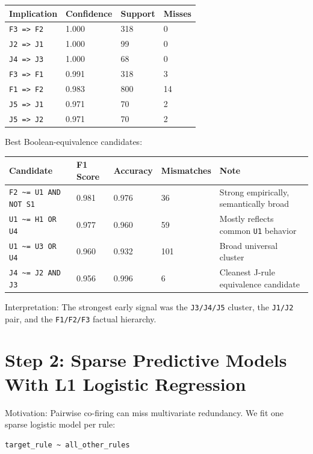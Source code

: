 \documentclass[11pt]{article}
\begin{document}
\begin{longtable}{L{0.35\textwidth} R{0.15\textwidth} R{0.15\textwidth} R{0.15\textwidth}}
\toprule
Implication & Confidence & Support & Misses \\
\midrule
\endhead
\texttt{F3 => F2} & 1.000 & 318 & 0 \\
\texttt{J2 => J1} & 1.000 & 99 & 0 \\
\texttt{J4 => J3} & 1.000 & 68 & 0 \\
\texttt{F3 => F1} & 0.991 & 318 & 3 \\
\texttt{F1 => F2} & 0.983 & 800 & 14 \\
\texttt{J5 => J1} & 0.971 & 70 & 2 \\
\texttt{J5 => J2} & 0.971 & 70 & 2 \\
\bottomrule
\end{longtable}

Best Boolean-equivalence candidates:

\begin{longtable}{L{0.30\textwidth} R{0.10\textwidth} R{0.12\textwidth} R{0.12\textwidth} L{0.25\textwidth}}
\toprule
Candidate & F1 Score & Accuracy & Mismatches & Note \\
\midrule
\endhead
\texttt{F2 \textasciitilde= U1 AND NOT S1} & 0.981 & 0.976 & 36 & Strong empirically, semantically broad \\
\texttt{U1 \textasciitilde= H1 OR U4} & 0.977 & 0.960 & 59 & Mostly reflects common \texttt{U1} behavior \\
\texttt{U1 \textasciitilde= U3 OR U4} & 0.960 & 0.932 & 101 & Broad universal cluster \\
\texttt{J4 \textasciitilde= J2 AND J3} & 0.956 & 0.996 & 6 & Cleanest J-rule equivalence candidate \\
\bottomrule
\end{longtable}

Interpretation: The strongest early signal was the \texttt{J3/J4/J5} cluster, the \texttt{J1/J2} pair, and the \texttt{F1/F2/F3} factual hierarchy.

\section*{Step 2: Sparse Predictive Models With L1 Logistic Regression}

Motivation: Pairwise co-firing can miss multivariate redundancy. We fit one sparse logistic model per rule:

\begin{verbatim}
target_rule ~ all_other_rules
\end{verbatim}
\end{document}
